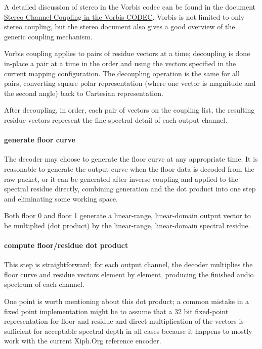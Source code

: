 A detailed discussion of stereo in the Vorbis codec can be found in
the document \href{stereo.html}{Stereo Channel Coupling in the
Vorbis CODEC}.  Vorbis is not limited to only stereo coupling, but
the stereo document also gives a good overview of the generic coupling
mechanism.

Vorbis coupling applies to pairs of residue vectors at a time;
decoupling is done in-place a pair at a time in the order and using
the vectors specified in the current mapping configuration.  The
decoupling operation is the same for all pairs, converting square
polar representation (where one vector is magnitude and the second
angle) back to Cartesian representation.

After decoupling, in order, each pair of vectors on the coupling list,
the resulting residue vectors represent the fine spectral detail
of each output channel.



\paragraph{generate floor curve}

The decoder may choose to generate the floor curve at any appropriate
time.  It is reasonable to generate the output curve when the floor
data is decoded from the raw packet, or it can be generated after
inverse coupling and applied to the spectral residue directly,
combining generation and the dot product into one step and eliminating
some working space.

Both floor 0 and floor 1 generate a linear-range, linear-domain output
vector to be multiplied (dot product) by the linear-range,
linear-domain spectral residue.



\paragraph{compute floor/residue dot product}

This step is straightforward; for each output channel, the decoder
multiplies the floor curve and residue vectors element by element,
producing the finished audio spectrum of each channel.

One point is worth mentioning about this dot product; a common mistake
in a fixed point implementation might be to assume that a 32 bit
fixed-point representation for floor and residue and direct
multiplication of the vectors is sufficient for acceptable spectral
depth in all cases because it happens to mostly work with the current
Xiph.Org reference encoder.

